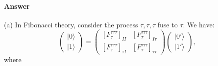 \documentclass{book}
\begin{document}
\paragraph{Answer}
(a) In Fibonacci theory, consider the process $\tau ,\tau ,\tau $ fuse to $\tau $. We have:
\begin{equation*}
\begin{pmatrix}
|0\rangle \\
|1\rangle 
\end{pmatrix} =\begin{pmatrix}
[F_{\tau }^{\tau \tau \tau } ]_{II} & [F_{\tau }^{\tau \tau \tau } ]_{I\tau }\\
[F_{\tau }^{\tau \tau \tau } ]_{\tau I} & [F_{\tau }^{\tau \tau \tau } ]_{\tau \tau }
\end{pmatrix}\begin{pmatrix}
|0'\rangle \\
|1'\rangle 
\end{pmatrix} ,
\end{equation*}
where
\end{document}
